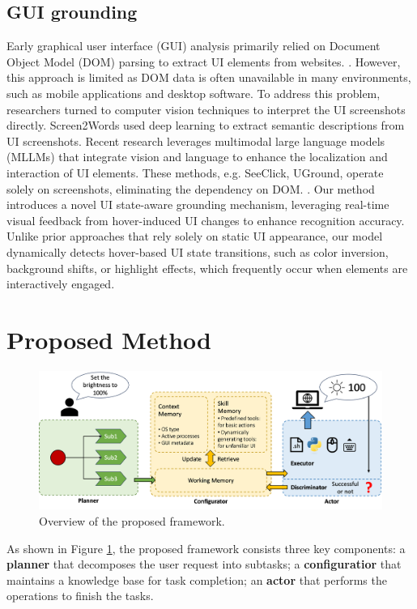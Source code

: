 \documentclass[11pt,letterpaper]{article}
\begin{document}
\subsection{GUI grounding}
Early graphical user interface (GUI) analysis primarily relied on Document Object Model (DOM) parsing to extract UI elements from websites. \cite{shi2017world}. 
However, this approach is limited as DOM data is often unavailable in many environments, such as mobile applications and desktop software. To address this problem, researchers turned to computer vision techniques to interpret the UI screenshots directly. Screen2Words used deep learning to extract semantic descriptions from UI screenshots. \cite{wang2021screen2words}
Recent research leverages multimodal large language models (MLLMs) that integrate vision and language to enhance the localization and interaction of UI elements. These methods, e.g. SeeClick, UGround, operate solely on screenshots, eliminating the dependency on DOM. \cite{cheng2024seeclick}\cite{gou2024navigating}.
Our method introduces a novel UI state-aware grounding mechanism, leveraging real-time visual feedback from hover-induced UI changes to enhance recognition accuracy. Unlike prior approaches that rely solely on static UI appearance, our model dynamically detects hover-based UI state transitions, such as color inversion, background shifts, or highlight effects, which frequently occur when elements are interactively engaged. 

\section{Proposed Method}
%
\begin{figure}
    \centering
    \includegraphics[width=0.8\linewidth]{framework.png}
    \vspace{-0.50cm}
    \caption{Overview of the proposed framework. }
    \vspace{-0.50cm}
    \label{fig:framework}
\end{figure}
%
As shown in Figure \ref{fig:framework}, the proposed framework consists three key components: 
%
a \textbf{planner} that decomposes the user request into subtasks; 
%
a \textbf{configuratior} that maintains a knowledge base for task completion; 
%
an \textbf{actor} that performs the operations to finish the tasks.
%
\end{document}
